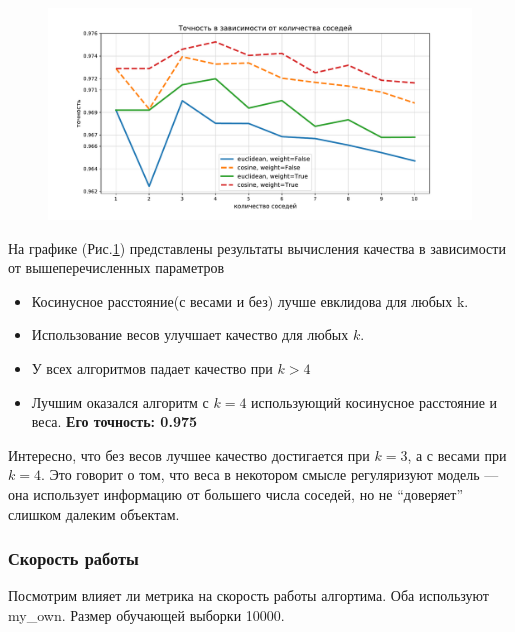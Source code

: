 \documentclass[12pt,fleqn]{article}
\begin{document}
\begin{figure}
    \centering
    \includegraphics[width=17cm]{task2.pdf}
    \caption{}
    \label{pic2}
\end{figure}

На графике (Рис.\ref{pic2}) представлены результаты вычисления качества в зависимости от
вышеперечисленных параметров


\begin{itemize}
    \item Косинусное расстояние(с весами и без) лучше евклидова для любых k.
    \item Использование весов улучшает качество для любых $k$.
    \item У всех алгоритмов падает качество при $k>4$
    \item Лучшим оказался алгоритм с $k=4$ использующий косинусное расстояние и веса.
    \textcolor{blue(ryb)}{\textbf{Его точность: 0.975}}
\end{itemize}

Интересно, что без весов лучшее качество достигается при $k=3$, а с весами  при $k=4$. 
Это говорит о том, что веса в некотором смысле регуляризуют модель --- она
использует информацию от большего числа соседей, но не ``доверяет'' слишком далеким объектам.

\newpage
\subsubsection{Скорость работы}
Посмотрим влияет ли метрика на скорость работы алгортима. Оба используют my\_own.
Размер обучающей выборки 10000.
\end{document}
